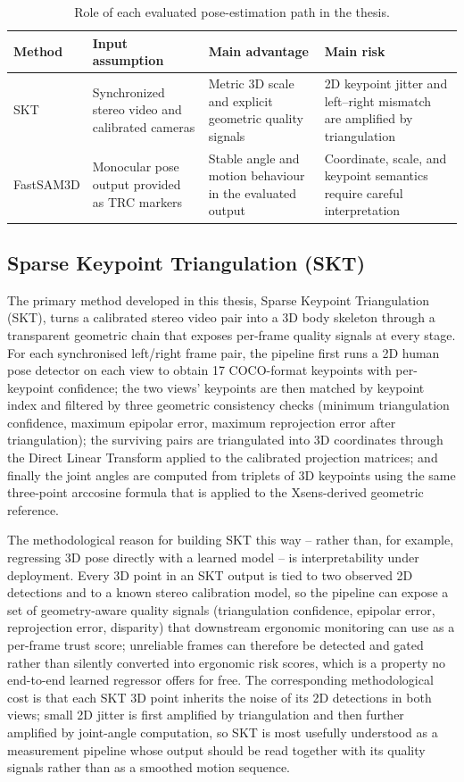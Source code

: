 \documentclass[12pt,a4paper]{article}
\begin{document}
\begin{table}[!htbp]
  \centering
  \caption{Role of each evaluated pose-estimation path in the thesis.}
  \label{tab:method_roles}
  \small
  \begin{tabularx}{\linewidth}{lXXX}
    \toprule
    Method & Input assumption & Main advantage & Main risk \\
    \midrule
    SKT
    & Synchronized stereo video and calibrated cameras
    & Metric 3D scale and explicit geometric quality signals
    & 2D keypoint jitter and left--right mismatch are amplified by triangulation \\
    FastSAM3D
    & Monocular pose output provided as TRC markers
    & Stable angle and motion behaviour in the evaluated output
    & Coordinate, scale, and keypoint semantics require careful interpretation \\
    \bottomrule
  \end{tabularx}
\end{table}

\subsection{Sparse Keypoint Triangulation (SKT)}

The primary method developed in this thesis, Sparse Keypoint Triangulation
(SKT), turns a calibrated stereo video pair into a 3D body skeleton through
a transparent geometric chain that exposes per-frame quality signals at
every stage.
For each synchronised left/right frame pair, the pipeline first runs a 2D
human pose detector on each view to obtain 17 COCO-format keypoints with
per-keypoint confidence; the two views' keypoints are then matched by
keypoint index and filtered by three geometric consistency checks
(minimum triangulation confidence, maximum epipolar error, maximum
reprojection error after triangulation); the surviving pairs are
triangulated into 3D coordinates through the Direct Linear Transform
applied to the calibrated projection matrices; and finally the joint
angles are computed from triplets of 3D keypoints using the same
three-point arccosine formula that is applied to the Xsens-derived
geometric reference.

The methodological reason for building SKT this way -- rather than, for
example, regressing 3D pose directly with a learned model -- is
interpretability under deployment.
Every 3D point in an SKT output is tied to two observed 2D detections and
to a known stereo calibration model, so the pipeline can expose a set of
geometry-aware quality signals (triangulation confidence, epipolar error,
reprojection error, disparity) that downstream ergonomic monitoring can
use as a per-frame trust score; unreliable frames can therefore be
detected and gated rather than silently converted into ergonomic risk
scores, which is a property no end-to-end learned regressor offers for
free.
The corresponding methodological cost is that each SKT 3D point inherits
the noise of its 2D detections in both views; small 2D jitter is first
amplified by triangulation and then further amplified by joint-angle
computation, so SKT is most usefully understood as a measurement pipeline
whose output should be read together with its quality signals rather than
as a smoothed motion sequence.
\end{document}

